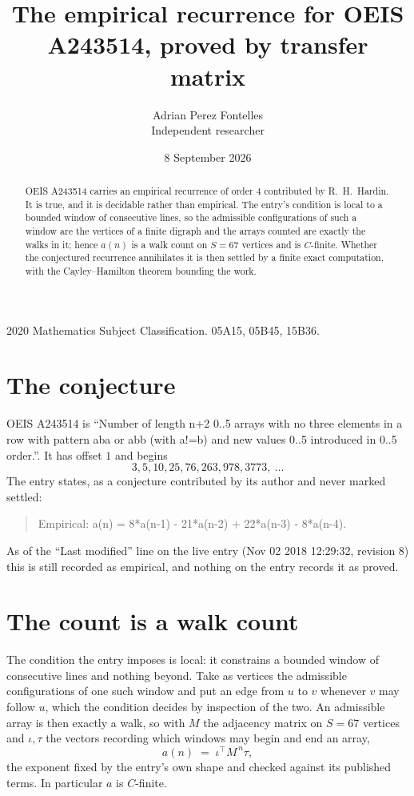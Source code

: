 \documentclass[11pt,a4paper]{article}
\title{The empirical recurrence for OEIS A243514, proved by transfer matrix}
\author{Adrian Perez Fontelles\\ \small Independent researcher}
\date{8 September 2026}
\theoremstyle{plain}
\theoremstyle{definition}
\begin{document}
\maketitle

\begin{abstract}
OEIS A243514 carries an empirical recurrence of order $4$ contributed by R.~H.~Hardin. It is
true, and it is decidable rather than empirical. The entry's condition is local to a bounded window of consecutive lines, so
the admissible configurations of such a window are the vertices of a finite digraph and the
arrays counted are exactly the walks in it; hence $a(n)$ is a walk count on $S=67$ vertices
and is $C$-finite. Whether the conjectured recurrence annihilates it is then settled by a
finite exact computation, with the Cayley--Hamilton theorem bounding the work.
\end{abstract}

\noindent\small 2020 Mathematics Subject Classification. 05A15, 05B45, 15B36.\normalsize

\section{The conjecture}

OEIS A243514 is ``Number of length n+2 0..5 arrays with no three elements in a row with pattern aba or abb (with a!=b) and new values 0..5 introduced in 0..5 order.''. It has offset $1$ and begins
\[
3, 5, 10, 25, 76, 263, 978, 3773,\ \dots
\]
The entry states, as a conjecture contributed by its author and never marked settled:
\begin{quote}
Empirical: a(n) = 8*a(n-1) - 21*a(n-2) + 22*a(n-3) - 8*a(n-4).
\end{quote}
As of the ``Last modified'' line on the live entry (Nov 02 2018 12:29:32, revision 8) this is still
recorded as empirical, and nothing on the entry records it as proved.

\section{The count is a walk count}

The condition the entry imposes is local: it constrains a bounded window of consecutive lines and nothing beyond. Take as
vertices the admissible configurations of one such window and put an edge from $u$ to $v$
whenever $v$ may follow $u$, which the condition decides by inspection of the two. An
admissible array is then exactly a walk, so with $M$ the adjacency matrix on $S=67$ vertices
and $\iota,\tau$ the vectors recording which windows may begin and end an array,
\[
a(n)\;=\;\iota^{\!\top}M^{\,n}\tau ,
\]
the exponent fixed by the entry's own shape and checked against its published terms. In
particular $a$ is $C$-finite.
\end{document}
